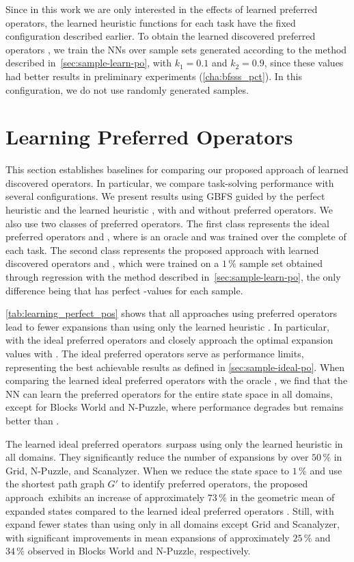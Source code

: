 \documentclass[ppgc,diss,english]{iiufrgs}
\begin{document}
Since in this work we are only interested in the effects of learned preferred operators, the learned heuristic functions \hnn for each task have the fixed configuration described earlier. To obtain the learned discovered preferred operators \pog, we train the NNs over sample sets generated according to the method described in~\cref{sec:sample-learn-po}, with $k_1 = 0.1$ and $k_2 = 0.9$, since these values had better results in preliminary experiments (\vref{cha:bfsss_pct}). In this configuration, we do not use randomly generated samples.


\section{Learning Preferred Operators}
\label{sec:exp-learning-po}
This section establishes baselines for comparing our proposed approach of learned discovered operators. In particular, we compare task-solving performance with several configurations. We present results using GBFS guided by the perfect heuristic \hstar and the learned heuristic \hnn, with and without preferred operators. We also use two classes of preferred operators. The first class represents the ideal preferred operators \postartable and \postar, where \postartable is an oracle and \postar was trained over the complete \fsp of each task. The second class represents the proposed approach with learned discovered operators \pogstar and \pog, which were trained on a $1\,\%$ sample set obtained through regression with the method described in~\cref{sec:sample-learn-po}, the only difference being that \pogstar has perfect \hstar-values for each sample.



\cref{tab:learning_perfect_pos} shows that all approaches using preferred operators lead to fewer expansions than using only the learned heuristic \hnn. In particular, \hnn with the ideal preferred operators \postartable and \postar closely approach the optimal expansion values with \hstar.
The ideal preferred operators serve as performance limits, representing the best achievable results as defined in \cref{sec:sample-ideal-po}. When comparing the learned ideal preferred operators \postar with the oracle \postartable, we find that the NN can learn the preferred operators for the entire state space in all domains, except for Blocks World and N-Puzzle, where performance degrades but remains better than \hnn.

The learned ideal preferred operators~\postar surpass using only the learned heuristic \hnn in all domains. They significantly reduce the number of expansions by over $50\,\%$ in Grid, N-Puzzle, and Scanalyzer. When we reduce the state space to $1\,\%$ and use the shortest path graph $G'$ to identify preferred operators, the proposed approach~\pog exhibits an increase of approximately $73\,\%$ in the geometric mean of expanded states compared to the learned ideal preferred operators \postar. Still, \hnn with \pog expand fewer states than using only \hnn in all domains except Grid and Scanalyzer, with significant improvements in mean expansions of approximately $25\,\%$ and $34\,\%$ observed in Blocks World and N-Puzzle, respectively.
\end{document}
